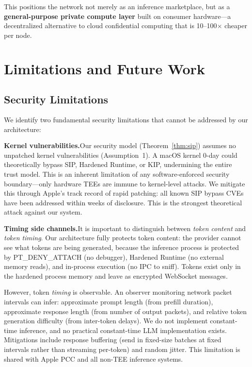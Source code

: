 \documentclass[10pt,twocolumn,letterpaper]{article}
\begin{document}
This positions the network not merely as an inference marketplace, but as a \textbf{general-purpose private compute layer} built on consumer hardware---a decentralized alternative to cloud confidential computing that is 10--100$\times$ cheaper per node.

\section{Limitations and Future Work}

\subsection{Security Limitations}

We identify two fundamental security limitations that cannot be addressed by our architecture:

\textbf{Kernel vulnerabilities.}\quad Our security model (Theorem~\ref{thm:sip}) assumes no unpatched kernel vulnerabilities (Assumption~1). A macOS kernel 0-day could theoretically bypass SIP, Hardened Runtime, or KIP, undermining the entire trust model. This is an inherent limitation of any software-enforced security boundary---only hardware TEEs are immune to kernel-level attacks. We mitigate this through Apple's track record of rapid patching: all known SIP bypass CVEs have been addressed within weeks of disclosure. This is the strongest theoretical attack against our system.

\textbf{Timing side channels.}\quad It is important to distinguish between \emph{token content} and \emph{token timing}. Our architecture fully protects token content: the provider cannot see what tokens are being generated, because the inference process is protected by PT\_DENY\_ATTACH (no debugger), Hardened Runtime (no external memory reads), and in-process execution (no IPC to sniff). Tokens exist only in the hardened process memory and leave as encrypted WebSocket messages.

However, token \emph{timing} is observable. An observer monitoring network packet intervals can infer: approximate prompt length (from prefill duration), approximate response length (from number of output packets), and relative token generation difficulty (from inter-token delays). We do not implement constant-time inference, and no practical constant-time LLM implementation exists. Mitigations include response buffering (send in fixed-size batches at fixed intervals rather than streaming per-token) and random jitter. This limitation is shared with Apple PCC and all non-TEE inference systems.
\end{document}
